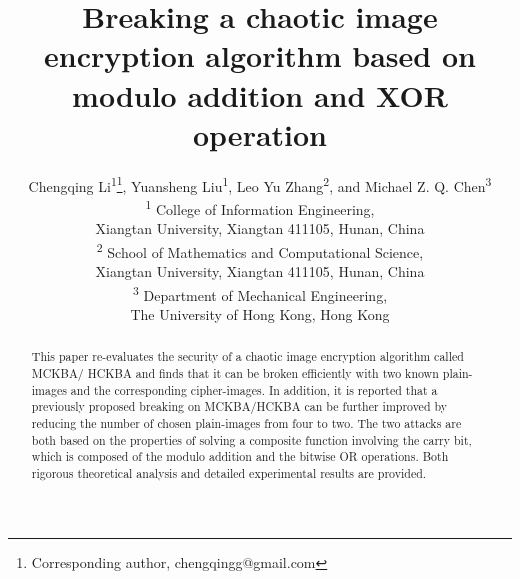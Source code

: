 \documentclass{ws-ijbc}
\begin{document}
\catchline{}{}{}{}{} 

\title{Breaking a chaotic image encryption algorithm based on modulo addition and XOR operation}

\author{Chengqing Li\textsuperscript{1}\thanks{Corresponding author, chengqingg@gmail.com},
Yuansheng Liu\textsuperscript{1}, Leo Yu Zhang\textsuperscript{2}, and Michael Z. Q. Chen\textsuperscript{3}\\
\textsuperscript{1} College of Information Engineering,\\ Xiangtan University, Xiangtan 411105, Hunan, China\\[0.5em]
\textsuperscript{2} School of Mathematics and Computational Science,\\
Xiangtan University, Xiangtan 411105, Hunan, China\\
\textsuperscript{3} Department of Mechanical Engineering,\\
The University of Hong Kong, Hong Kong
}

\iffalse
\author{Chengqing Li}

\address{College of Information Engineering,\\
Xiangtan University, Xiangtan 411105, Hunan, China}

\author{Yuansheng Liu}

\address{College of Information Engineering,\\
Xiangtan University, Xiangtan 411105, Hunan, China\\
leoxtu@gmail.com}

\author{Leo Yu Zhang\thanks{Corresponding author, leoxtu@gmail.com}}

\address{School of Mathematics and Computational Science,\\
Xiangtan University, Xiangtan 411105, Hunan, China\\
chengqingg@gmail.com}
\fi

\maketitle


\begin{abstract}
This paper re-evaluates the security of a chaotic image encryption algorithm called MCKBA/ HCKBA and finds that it can be broken efficiently with two known plain-images and the corresponding cipher-images. In addition, it is reported that a previously proposed breaking on MCKBA/HCKBA can be further improved by reducing the number of chosen plain-images from four to two. The two attacks are both based on the properties of solving a composite function involving the carry bit, which is composed of the modulo addition and the bitwise OR operations. Both rigorous theoretical analysis and detailed experimental results are provided.
\end{abstract}
\end{document}
